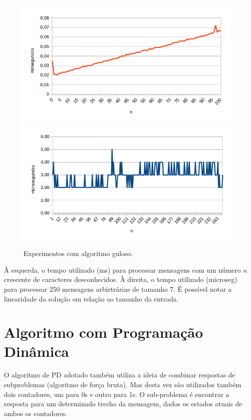 \documentclass[a4paper,12pt,titlepage]{article}
\begin{document}
\begin{figure}[H]
     \centering
     \includegraphics[scale=0.48]{figures/chart-ga.png}
     \includegraphics[scale=0.48]{figures/chart-ga-all.png}
     \caption{Experimentos com algoritmo guloso. }
\end{figure}

À esquerda, o tempo utilizado (ms) para processar mensagens com um número $n$ crescente de caracteres desconhecidos. À direita, o tempo utilizado (microseg) para processar 250 mensagens arbirtrárias de tamanho 7. É possível notar a linearidade da solução em relação ao tamanho da entrada.


\section{Algoritmo com Programação Dinâmica}

O algoritmo de PD adotado também utiliza a ideia de combinar respostas de subproblemas (algoritmo de força bruta). Mas desta vez são utilizados também dois contadores, um para 0s e outro para 1s. O sub-problema é encontrar a resposta para um determinado trecho da mensagem, dados os estados atuais de ambos os contadores. 
\end{document}
